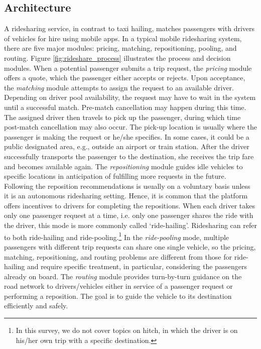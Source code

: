 \documentclass{article}
\begin{document}
\subsection{Architecture}\label{sec:architecture}
A ridesharing service, in contrast to taxi hailing, matches passengers with drivers of vehicles for hire using mobile apps. 
In a typical mobile ridesharing system, there are five major modules: pricing, matching, repositioning, pooling, and routing. Figure \ref{fig:rideshare_process} illustrates the process and decision modules.
When a potential passenger submits a trip request, the \emph{pricing} module offers a quote, which the passenger either accepts or rejects. Upon acceptance, the \emph{matching} module attempts to assign the request to an available driver. Depending on driver pool availability, the request may have to wait in the system until a successful match. Pre-match cancellation may happen during this time. The assigned driver then travels to pick up the passenger, during which time post-match cancellation may also occur. The pick-up location is usually where the passenger is making the request or he/she specifies. In some cases, it could be a public designated area, e.g., outside an airport or train station. After the driver successfully transports the passenger to the destination, she receives the trip fare and becomes available again. The \emph{repositioning} module guides idle vehicles to specific locations in anticipation of fulfilling more requests in the future. Following the reposition recommendations is usually on a voluntary basis unless it is an autonomous ridesharing setting. Hence, it is common that the  platform offers incentives to drivers for completing the repositions. 
When each driver takes only one passenger request at a time, i.e. only one passenger shares the ride with the driver, this mode is more commonly called `ride-hailing'. Ridesharing can refer to both ride-hailing and ride-pooling.\footnote{In this survey, we do not cover topics on hitch, in which the driver is on his/her own trip with a specific destination.}
In the \emph{ride-pooling} mode, multiple passengers with different trip requests can share one single vehicle, so the pricing, matching, repositioning, and routing problems are different from those for ride-hailing and require specific treatment, in particular, considering the passengers already on board.
The \emph{routing} module provides turn-by-turn guidance on the road network to drivers/vehicles either in service of a passenger request or performing a reposition. The goal is to guide the vehicle to its destination efficiently and safely.  
\end{document}
